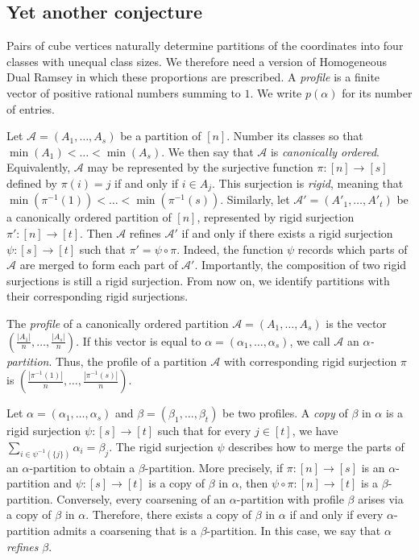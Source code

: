 \documentclass[11pt]{article}
\theoremstyle{remark}
\begin{document}
\subsection{Yet another conjecture}

Pairs of cube vertices naturally determine partitions of the coordinates into four classes with unequal class sizes. 
We therefore need a version of Homogeneous Dual Ramsey in which these proportions are prescribed.
A \emph{profile} is a finite vector of positive rational numbers summing to $1$.
We write $p(\alpha)$ for its number of entries.

Let $\mathcal{A}=(A_1,\ldots,A_s)$ be a partition of $[n]$. 
Number its classes so that $\min(A_1) < \ldots < \min(A_s)$.
We then say that $\mathcal{A}$ is \emph{canonically ordered}.
Equivalently, $\mathcal{A}$ may be represented by the surjective function $\pi\colon [n]\to[s]$ defined by $\pi(i)=j$ if and only if $i\in A_j$.
This surjection is \emph{rigid}, meaning that $\min(\pi^{-1}(1)) < \ldots < \min(\pi^{-1}(s))$.
Similarly, let $\mathcal{A}'=(A'_1,\ldots,A'_t)$ be a canonically ordered partition of $[n]$, represented by rigid surjection $\pi'\colon[n]\to[t]$. 
Then $\mathcal{A}$ refines $\mathcal{A}'$ if and only if there exists a rigid surjection $\psi\colon[s]\to[t]$ such that $\pi'=\psi\circ\pi$. 
Indeed, the function $\psi$ records which parts of $\mathcal{A}$ are merged to form each part of $\mathcal{A}'$.
Importantly, the composition of two rigid surjections is still a rigid surjection.
From now on, we identify partitions with their corresponding rigid surjections.

The \emph{profile} of a canonically ordered partition $\mathcal{A}=(A_1,\ldots,A_s)$ is the vector $\left(\frac{|A_1|}{n},\ldots,\frac{|A_s|}{n}\right)$. 
If this vector is equal to $\alpha=(\alpha_1,\ldots,\alpha_s)$, we call $\mathcal{A}$ an \emph{$\alpha$-partition}. 
Thus, the profile of a partition $\mathcal{A}$ with corresponding rigid surjection $\pi$ is $\left(\frac{|\pi^{-1}(1)|}{n},\ldots,\frac{|\pi^{-1}(s)|}{n}\right)$.

Let $\alpha=(\alpha_1,\ldots,\alpha_s)$ and $\beta=(\beta_1,\ldots,\beta_t)$ be two profiles. 
A \emph{copy} of $\beta$ in $\alpha$ is a rigid surjection $\psi\colon[s]\to[t]$ such that for every $j\in[t]$, we have $\sum_{i\in\psi^{-1}(\{j\})}\alpha_i=\beta_j$. 
The rigid surjection $\psi$ describes how to merge the parts of an $\alpha$-partition to obtain a $\beta$-partition.
More precisely, if $\pi\colon[n]\to[s]$ is an $\alpha$-partition and $\psi : [s] \to [t]$ is a copy of $\beta$ in $\alpha$, then $\psi\circ\pi\colon[n]\to[t]$ is a $\beta$-partition. 
Conversely, every coarsening of an $\alpha$-partition with profile $\beta$ arises via a copy of $\beta$ in $\alpha$.
Therefore, there exists a copy of $\beta$ in $\alpha$ if and only if every $\alpha$-partition admits a coarsening that is a $\beta$-partition. In this case, we say that $\alpha$ \emph{refines} $\beta$.
\end{document}
